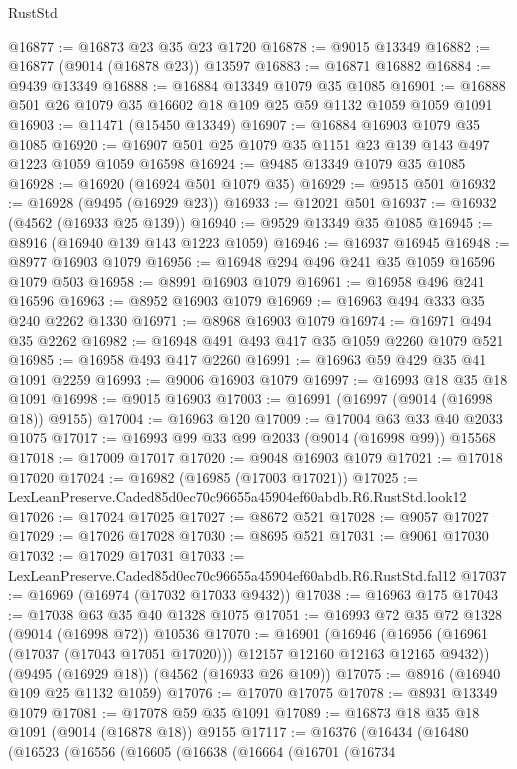 \begin{lexlean}{RustStd}
\begin{coremodule}
@16877 := @16873 @23 @35 @23 @1720
@16878 := @9015 @13349
@16882 := @16877 (@9014 (@16878 @23)) @13597
@16883 := @16871 @16882
@16884 := @9439 @13349
@16888 := @16884 @13349 @1079 @35 @1085
@16901 := @16888 @501 @26 @1079 @35 @16602 @18 @109 @25 @59 @1132 @1059 @1059 @1091
@16903 := @11471 (@15450 @13349)
@16907 := @16884 @16903 @1079 @35 @1085
@16920 := @16907 @501 @25 @1079 @35 @1151 @23 @139 @143 @497 @1223 @1059 @1059 @16598
@16924 := @9485 @13349 @1079 @35 @1085
@16928 := @16920 (@16924 @501 @1079 @35)
@16929 := @9515 @501
@16932 := @16928 (@9495 (@16929 @23))
@16933 := @12021 @501
@16937 := @16932 (@4562 (@16933 @25 @139))
@16940 := @9529 @13349 @35 @1085
@16945 := @8916 (@16940 @139 @143 @1223 @1059)
@16946 := @16937 @16945
@16948 := @8977 @16903 @1079
@16956 := @16948 @294 @496 @241 @35 @1059 @16596 @1079 @503
@16958 := @8991 @16903 @1079
@16961 := @16958 @496 @241 @16596
@16963 := @8952 @16903 @1079
@16969 := @16963 @494 @333 @35 @240 @2262 @1330
@16971 := @8968 @16903 @1079
@16974 := @16971 @494 @35 @2262
@16982 := @16948 @491 @493 @417 @35 @1059 @2260 @1079 @521
@16985 := @16958 @493 @417 @2260
@16991 := @16963 @59 @429 @35 @41 @1091 @2259
@16993 := @9006 @16903 @1079
@16997 := @16993 @18 @35 @18 @1091
@16998 := @9015 @16903
@17003 := @16991 (@16997 (@9014 (@16998 @18)) @9155)
@17004 := @16963 @120
@17009 := @17004 @63 @33 @40 @2033 @1075
@17017 := @16993 @99 @33 @99 @2033 (@9014 (@16998 @99)) @15568
@17018 := @17009 @17017
@17020 := @9048 @16903 @1079
@17021 := @17018 @17020
@17024 := @16982 (@16985 (@17003 @17021))
@17025 := LexLeanPreserve.Caded85d0ec70c96655a45904ef60abdb.R6.RustStd.look12
@17026 := @17024 @17025
@17027 := @8672 @521
@17028 := @9057 @17027
@17029 := @17026 @17028
@17030 := @8695 @521
@17031 := @9061 @17030
@17032 := @17029 @17031
@17033 := LexLeanPreserve.Caded85d0ec70c96655a45904ef60abdb.R6.RustStd.fal12
@17037 := @16969 (@16974 (@17032 @17033 @9432))
@17038 := @16963 @175
@17043 := @17038 @63 @35 @40 @1328 @1075
@17051 := @16993 @72 @35 @72 @1328 (@9014 (@16998 @72)) @10536
@17070 := @16901
    (@16946 (@16956 (@16961 (@17037 (@17043 @17051 @17020))) @12157 @12160 @12163 @12165 @9432))
    (@9495 (@16929 @18))
    (@4562 (@16933 @26 @109))
@17075 := @8916 (@16940 @109 @25 @1132 @1059)
@17076 := @17070 @17075
@17078 := @8931 @13349 @1079
@17081 := @17078 @59 @35 @1091
@17089 := @16873 @18 @35 @18 @1091 (@9014 (@16878 @18)) @9155
@17117 := @16376
    (@16434
      (@16480
        (@16523
          (@16556
            (@16605
              (@16638
                (@16664
                  (@16701
                    (@16734

\end{coremodule}
\end{lexlean}
